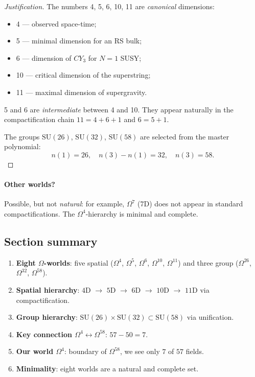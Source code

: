 \documentclass[11pt,a4paper]{article}
\newcommand{\SU}{\mathrm{SU}}
\newcommand{\CY}{CY_3}
\newcommand{\Om}{\Omega^4}
\newcommand{\Omf}{\Omega^5}
\newcommand{\Oms}{\Omega^6}
\newcommand{\Omt}{\Omega^{10}}
\newcommand{\Ome}{\Omega^{11}}
\newcommand{\Omtw}{\Omega^{26}}
\newcommand{\Omth}{\Omega^{32}}
\newcommand{\Omfi}{\Omega^{58}}
\theoremstyle{definition}
\begin{document}
\begin{proof}[Justification]
The numbers 4, 5, 6, 10, 11 are \emph{canonical} dimensions:
\begin{itemize}
    \item 4 — observed space-time;
    \item 5 — minimal dimension for an RS bulk;
    \item 6 — dimension of $\CY$ for $N = 1$ SUSY;
    \item 10 — critical dimension of the superstring;
    \item 11 — maximal dimension of supergravity.
\end{itemize}
5 and 6 are \emph{intermediate} between 4 and 10. They appear 
naturally in the compactification chain $11 = 4 + 6 + 1$ 
and $6 = 5 + 1$.

The groups $\SU(26)$, $\SU(32)$, $\SU(58)$ are selected from the 
master polynomial:
\begin{equation}
    n(1) = 26, \quad n(3) - n(1) = 32, \quad n(3) = 58.
\end{equation}
\end{proof}

\paragraph{Other worlds?} 
Possible, but not \emph{natural}: for example, $\Omega^7$ (7D) 
does not appear in standard compactifications. The $\Om$-hierarchy 
is minimal and complete.

\subsection{Section summary}
\label{subsec:worlds-summary}

\begin{enumerate}
    \item \textbf{Eight $\Omega$-worlds}: five spatial 
          ($\Om$, $\Omf$, $\Oms$, $\Omt$, $\Ome$) and three 
          group ($\Omtw$, $\Omth$, $\Omfi$).
    \item \textbf{Spatial hierarchy}: 
          $4$D $\to$ $5$D $\to$ $6$D $\to$ $10$D $\to$ $11$D 
          via compactification.
    \item \textbf{Group hierarchy}: 
          $\SU(26) \times \SU(32) \subset \SU(58)$ via 
          unification.
    \item \textbf{Key connection $\Om \leftrightarrow \Omfi$}: 
          $57 - 50 = 7$.
    \item \textbf{Our world $\Om$}: boundary of $\Omfi$, we see only 
          $7$ of $57$ fields.
    \item \textbf{Minimality}: eight worlds are a natural 
          and complete set.
\end{enumerate}
\end{document}
